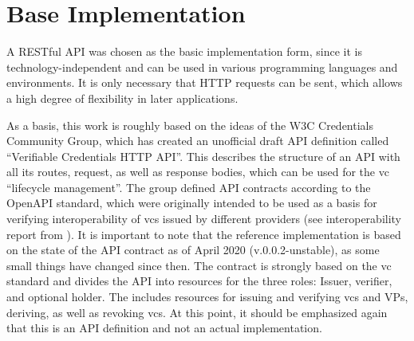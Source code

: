     \section{Base Implementation}\label{section: base-implementation}
    A RESTful API was chosen as the basic implementation form, since it is technology-independent and can be used in various programming languages and environments. It is only necessary that HTTP requests can be sent, which allows a high degree of flexibility in later applications. 
    
    As a basis, this work is roughly based on the ideas of the W3C Credentials Community Group, which has created an unofficial draft API definition called “Verifiable Credentials HTTP API”. This describes the structure of an API with all its routes, request, as well as response bodies, which can be used for the \ac{vc} “lifecycle management”. The group defined API contracts according to the OpenAPI standard, which were originally intended to be used as a basis for verifying interoperability of \acp{vc} issued by different providers (see interoperability report from \cite{homeland_security_preventing_2020}). It is important to note that the reference implementation is based on the state of the API contract as of April 2020 (v.0.0.2-unstable), as some small things have changed since then. The contract is strongly based on the \ac{vc} standard and divides the API into resources for the three roles: Issuer, verifier, and optional holder. The includes resources for issuing and verifying \acp{vc} and \acp{VP}, deriving, as well as revoking \acp{vc}. At this point, it should be emphasized again that this is an API definition and not an actual implementation. \cite{world_wide_web_consortium_credentials_community_group_vc_2021, world_wide_web_consortium_credentials_community_group_verifiable_2021}
    
